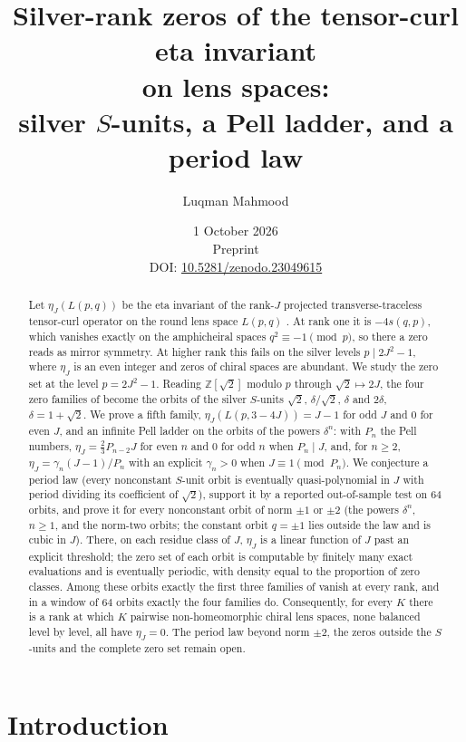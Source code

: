 \documentclass[11pt]{article}
\title{Silver-rank zeros of the tensor-curl eta invariant\\
on lens spaces:\\
silver $S$-units, a Pell ladder, and a period law}
\author{Luqman Mahmood}
\date{1 October 2026\\[3pt]\small Preprint\\
DOI: \href{https://doi.org/10.5281/zenodo.23049615}{10.5281/zenodo.23049615}}
\theoremstyle{definition}
\newcommand{\Z}{\mathbb Z}
\begin{document}
\maketitle

\begin{abstract}
Let $\eta_J(L(p,q))$ be the eta invariant of the rank-$J$ projected
transverse-traceless tensor-curl operator on the round lens space
$L(p,q)$ \cite{MahmoodP1Collection2026}.  At rank one it is $-4s(q,p)$,
which vanishes exactly on the amphicheiral spaces $q^2\equiv-1\pmod p$,
so there a zero reads as mirror symmetry.  At higher rank this fails on
the silver levels $p\mid2J^2-1$, where $\eta_J$ is an even integer and
zeros of chiral spaces are abundant.  We study the zero set at the level
$p=2J^2-1$.  Reading $\Z[\sqrt2]$ modulo $p$ through $\sqrt2\mapsto2J$,
the four zero families of \cite{MahmoodP1Collection2026} become the
orbits of the silver $S$-units $\sqrt2$, $\delta/\sqrt2$, $\delta$ and
$2\delta$, $\delta=1+\sqrt2$.  We prove a fifth family,
$\eta_J(L(p,3-4J))=J-1$ for odd $J$ and $0$ for even $J$, and an infinite
Pell ladder on the orbits of the powers $\delta^n$: with $P_n$ the Pell
numbers, $\eta_J=\tfrac23P_{n-2}J$ for even $n$ and $0$ for odd $n$ when
$P_n\mid J$, and, for $n\geq2$, $\eta_J=\gamma_n(J-1)/P_n$ with an
explicit $\gamma_n>0$ when $J\equiv1\pmod{P_n}$.
We conjecture a period law (every nonconstant $S$-unit orbit is eventually
quasi-polynomial in $J$ with period dividing its coefficient of $\sqrt2$),
support it by a reported out-of-sample test on $64$ orbits, and prove it
for every nonconstant orbit of norm $\pm1$ or $\pm2$
(the powers $\delta^n$, $n\geq1$, and the norm-two orbits; the constant
orbit $q=\pm1$ lies outside the law and is cubic in $J$).  There, on
each residue class of $J$, $\eta_J$ is a linear function of $J$ past an
explicit threshold; the zero set of each orbit is computable by
finitely many exact evaluations and is eventually periodic, with density
equal to the proportion of zero classes.  Among these orbits exactly the
first three families of \cite{MahmoodP1Collection2026} vanish at every
rank, and in a window of $64$ orbits exactly the four families do.
Consequently, for every $K$ there is a rank at which $K$ pairwise
non-homeomorphic chiral lens spaces, none balanced level by level, all
have $\eta_J=0$.  The period law beyond norm $\pm2$, the zeros outside
the $S$-units and the complete zero set remain open.
\end{abstract}

\section{Introduction}
\label{sec:intro}
\end{document}
